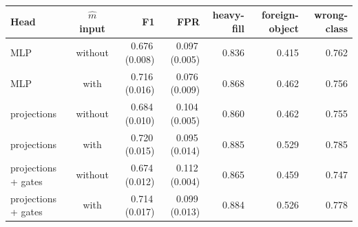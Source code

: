 \begin{table}[tb]
\centering
\caption{}
\label{tab:ablation}
\begin{tabular}{lcrrrrr}
\toprule
Head & $\hat{m}$ input & F1 & FPR & heavy-fill & foreign-object & wrong-class \\
\midrule
MLP & without & 0.676\,(0.008) & 0.097\,(0.005) & 0.836 & 0.415 & 0.762 \\
MLP & with & 0.716\,(0.016) & 0.076\,(0.009) & 0.868 & 0.462 & 0.756 \\
projections & without & 0.684\,(0.010) & 0.104\,(0.005) & 0.860 & 0.462 & 0.755 \\
projections & with & 0.720\,(0.015) & 0.095\,(0.014) & 0.885 & 0.529 & 0.785 \\
projections + gates & without & 0.674\,(0.012) & 0.112\,(0.004) & 0.865 & 0.459 & 0.747 \\
projections + gates & with & 0.714\,(0.017) & 0.099\,(0.013) & 0.884 & 0.526 & 0.778 \\
\bottomrule
\end{tabular}
\end{table}
